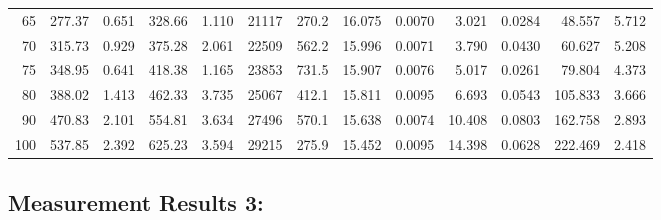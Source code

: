 \documentclass[10pt]{article}
\begin{document}
{\begin{tabular}{|r|rr|rr|rr|rr|rr|r|r|}
       65 &       277.37 &        0.651 &       328.66 &        1.110 &        21117 &        270.2 &       16.075 &       0.0070 &        3.021 &       0.0284 &       48.557 &        5.712 \\
       70 &       315.73 &        0.929 &       375.28 &        2.061 &        22509 &        562.2 &       15.996 &       0.0071 &        3.790 &       0.0430 &       60.627 &        5.208 \\
       75 &       348.95 &        0.641 &       418.38 &        1.165 &        23853 &        731.5 &       15.907 &       0.0076 &        5.017 &       0.0261 &       79.804 &        4.373 \\
       80 &       388.02 &        1.413 &       462.33 &        3.735 &        25067 &        412.1 &       15.811 &       0.0095 &        6.693 &       0.0543 &      105.833 &        3.666 \\
       90 &       470.83 &        2.101 &       554.81 &        3.634 &        27496 &        570.1 &       15.638 &       0.0074 &       10.408 &       0.0803 &      162.758 &        2.893 \\
      100 &       537.85 &        2.392 &       625.23 &        3.594 &        29215 &        275.9 &       15.452 &       0.0095 &       14.398 &       0.0628 &      222.469 &        2.418 \\
\hline
\end{tabular}
}



\subsection*{\large \bf Measurement Results 3:}
\end{document}
